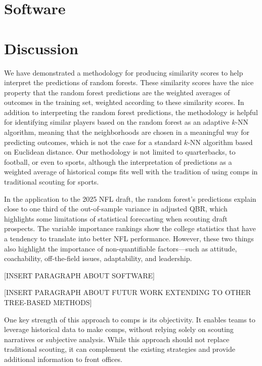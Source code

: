 \documentclass{article}
\begin{document}
\section{Software}
\label{sec:software}

\section{Discussion}
\label{sec:discussion}

We have demonstrated a methodology for producing similarity scores to help interpret the predictions of random forests. These similarity scores have the nice property that the random forest predictions are the weighted averages of outcomes in the training set, weighted according to these similarity scores. In addition to interpreting the random forest predictions, the methodology is helpful for identifying similar players based on the random forest as an adaptive $k$-NN algorithm, meaning that the neighborhoods are chosen in a meaningful way for predicting outcomes, which is not the case for a standard $k$-NN algorithm based on Euclidean distance. Our methodology is not limited to quarterbacks, to football, or even to sports, although the interpretation of predictions as a weighted average of historical comps fits well with the tradition of using comps in traditional scouting for sports.

In the application to the 2025 NFL draft, the random forest's predictions explain close to one third of the out-of-sample variance in adjusted QBR, which highlights some limitations of statistical forecasting when scouting draft prospects. The variable importance rankings show the college statistics that have a tendency to translate into better NFL performance. However, these two things also highlight the importance of non-quantifiable factors---such as attitude, coachability, off-the-field issues, adaptability, and leadership.

[INSERT PARAGRAPH ABOUT SOFTWARE]

[INSERT PARAGRAPH ABOUT FUTUR WORK EXTENDING TO OTHER TREE-BASED METHODS]

One key strength of this approach to comps is its objectivity. It enables teams to leverage historical data to make comps, without relying solely on scouting narratives or subjective analysis. While this approach should not replace traditional scouting, it can complement the existing strategies and provide additional information to front offices. 


\end{document}
